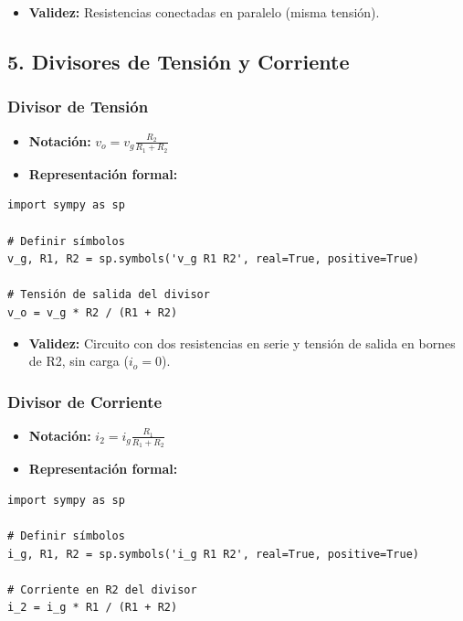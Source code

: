 \documentclass[11pt,a4paper]{article}
\begin{document}
\begin{itemize}[leftmargin=*,topsep=2pt,itemsep=1pt]
  \item \textbf{Validez:} Resistencias conectadas en paralelo (misma tensión).
\end{itemize}


\subsection*{5. Divisores de Tensión y Corriente}


\subsubsection*{Divisor de Tensión}


\begin{itemize}[leftmargin=*,topsep=2pt,itemsep=1pt]
  \item \textbf{Notación:} $v_o = v_g \frac{R_2}{R_1 + R_2}$
  \item \textbf{Representación formal:}
\end{itemize}


\begin{lstlisting}
import sympy as sp

# Definir símbolos
v_g, R1, R2 = sp.symbols('v_g R1 R2', real=True, positive=True)

# Tensión de salida del divisor
v_o = v_g * R2 / (R1 + R2)
\end{lstlisting}


\begin{itemize}[leftmargin=*,topsep=2pt,itemsep=1pt]
  \item \textbf{Validez:} Circuito con dos resistencias en serie y tensión de salida en bornes de R2, sin carga ($i_o=0$).
\end{itemize}


\subsubsection*{Divisor de Corriente}


\begin{itemize}[leftmargin=*,topsep=2pt,itemsep=1pt]
  \item \textbf{Notación:} $i_2 = i_g \frac{R_1}{R_1 + R_2}$
  \item \textbf{Representación formal:}
\end{itemize}


\begin{lstlisting}
import sympy as sp

# Definir símbolos
i_g, R1, R2 = sp.symbols('i_g R1 R2', real=True, positive=True)

# Corriente en R2 del divisor
i_2 = i_g * R1 / (R1 + R2)
\end{lstlisting}
\end{document}
